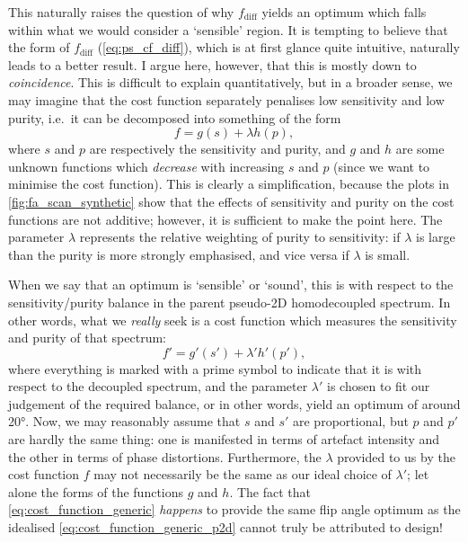 This naturally raises the question of why $f_\text{diff}$ yields an optimum which falls within what we would consider a `sensible' region.
It is tempting to believe that the form of $f_\text{diff}$ (\cref{eq:ps_cf_diff}), which is at first glance quite intuitive, naturally leads to a better result.
I argue here, however, that this is mostly down to \textit{coincidence}.
This is difficult to explain quantitatively, but in a broader sense, we may imagine that the cost function separately penalises low sensitivity and low purity, i.e.\ it can be decomposed into something of the form
\begin{equation}
    \label{eq:cost_function_generic}
    f = g(s) + \lambda h(p),
\end{equation}
where $s$ and $p$ are respectively the sensitivity and purity, and $g$ and $h$ are some unknown functions which \textit{decrease} with increasing $s$ and $p$ (since we want to minimise the cost function).
This is clearly a simplification, because the plots in \cref{fig:fa_scan_synthetic} show that the effects of sensitivity and purity on the cost functions are not additive; however, it is sufficient to make the point here.
The parameter $\lambda$ represents the relative weighting of purity to sensitivity: if $\lambda$ is large than the purity is more strongly emphasised, and vice versa if $\lambda$ is small.

When we say that an optimum is `sensible' or `sound', this is with respect to the sensitivity/purity balance in the parent pseudo-2D homodecoupled spectrum.
In other words, what we \textit{really} seek is a cost function which measures the sensitivity and purity of that spectrum:
\begin{equation}
    \label{eq:cost_function_generic_p2d}
    f' = g'(s') + \lambda' h'(p'),
\end{equation}
where everything is marked with a prime symbol to indicate that it is with respect to the decoupled spectrum, and the parameter $\lambda'$ is chosen to fit our judgement of the required balance, or in other words, yield an optimum of around \ang{20}.
Now, we may reasonably assume that $s$ and $s'$ are proportional, but $p$ and $p'$ are hardly the same thing: one is manifested in terms of artefact intensity and the other in terms of phase distortions.
Furthermore, the $\lambda$ provided to us by the cost function $f$ may not necessarily be the same as our ideal choice of $\lambda'$; let alone the forms of the functions $g$ and $h$.
The fact that \cref{eq:cost_function_generic} \textit{happens} to provide the same flip angle optimum as the idealised \cref{eq:cost_function_generic_p2d} cannot truly be attributed to design!

